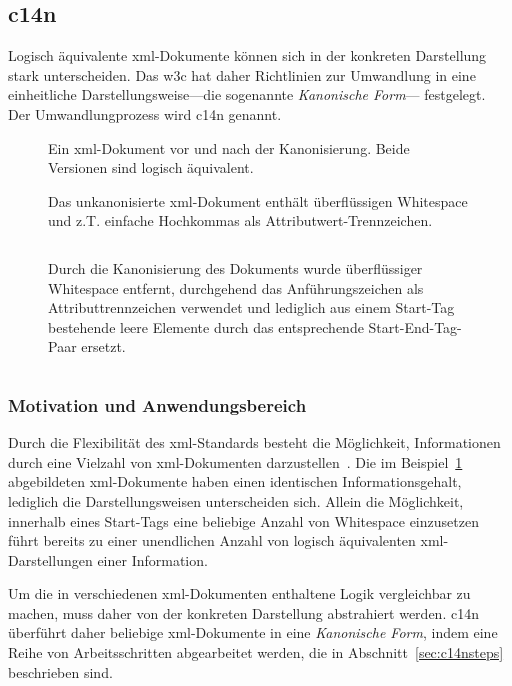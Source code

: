 \subsection{\acrfull{c14n}}
\label{sec:c14n}

Logisch äquivalente \acrshort{xml}-Dokumente können sich in der konkreten Darstellung
stark unterscheiden. Das \gls{w3c} hat daher Richtlinien zur Umwandlung in eine
einheitliche Darstellungsweise---die sogenannte \emph{Kanonische Form}---
festgelegt. Der Umwandlungprozess wird \acrfull{c14n} genannt.~\cite{boyer2001c14n}

\begin{figure}[h!]
\begin{example}[Kanonisierung]
    \label{ex:c14n}
    Ein \acrshort{xml}-Dokument vor und nach der Kanonisierung. Beide Versionen sind
    logisch äquivalent.

    Das unkanonisierte \acrshort{xml}-Dokument enthält überflüssigen Whitespace und z.T. einfache Hochkommas als Attributwert-Trennzeichen.
    \inputminted{xml}{ex-c14n-pre.xml}
    Durch die Kanonisierung des Dokuments wurde überflüssiger Whitespace entfernt, durchgehend das Anführungszeichen als Attributtrennzeichen verwendet und lediglich aus einem Start-Tag bestehende leere Elemente durch das entsprechende Start-End-Tag-Paar ersetzt.
    \inputminted{xml}{ex-c14n-post.xml}
\end{example}
\end{figure}

\subsubsection{Motivation und Anwendungsbereich}
\label{sec:c14nscope}

Durch die Flexibilität des \acrshort{xml}-Standards besteht die Möglichkeit, Informationen durch eine Vielzahl von \acrshort{xml}-Dokumenten darzustellen~\cite{siddiqui2002c14n}. Die im Beispiel~\ref{ex:c14n} abgebildeten \acrshort{xml}-Dokumente haben einen identischen Informationsgehalt, lediglich die Darstellungsweisen unterscheiden sich. Allein die Möglichkeit, innerhalb eines Start-Tags eine beliebige Anzahl von Whitespace einzusetzen~\cite[Produktionsregeln 3 und 40]{maler2008xml} führt bereits zu einer unendlichen Anzahl von logisch äquivalenten \acrshort{xml}-Darstellungen einer Information.

Um die in verschiedenen \acrshort{xml}-Dokumenten enthaltene Logik vergleichbar zu machen, muss daher von der konkreten Darstellung abstrahiert werden. \acrlong{c14n} überführt daher beliebige \acrshort{xml}-Dokumente in eine \emph{Kanonische Form}, indem eine Reihe von Arbeitsschritten abgearbeitet werden, die in Abschnitt~\ref{sec:c14nsteps} beschrieben sind.

